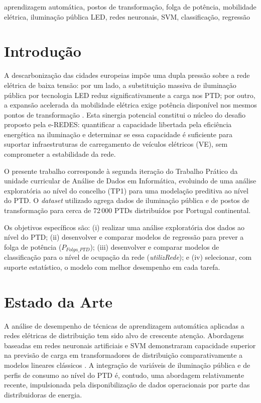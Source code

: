 \documentclass[conference]{IEEEtran}
\begin{document}
\begin{IEEEkeywords}
aprendizagem automática, postos de transformação, folga de potência, mobilidade elétrica, iluminação pública LED, redes neuronais, SVM, classificação, regressão
\end{IEEEkeywords}

\section{Introdução}

A descarbonização das cidades europeias impõe uma dupla pressão sobre a rede elétrica de baixa tensão: por um lado, a substituição massiva de iluminação pública por tecnologia LED reduz significativamente a carga nos PTD; por outro, a expansão acelerada da mobilidade elétrica exige potência disponível nos mesmos pontos de transformação \cite{eredes}. Esta sinergia potencial constitui o núcleo do desafio proposto pela e-REDES: quantificar a capacidade libertada pela eficiência energética na iluminação e determinar se essa capacidade é suficiente para suportar infraestruturas de carregamento de veículos elétricos (VE), sem comprometer a estabilidade da rede.

O presente trabalho corresponde à segunda iteração do Trabalho Prático da unidade curricular de Análise de Dados em Informática, evoluindo de uma análise exploratória ao nível do concelho (TP1) para uma modelação preditiva ao nível do PTD. O \textit{dataset} utilizado agrega dados de iluminação pública e de postos de transformação para cerca de 72\,000 PTDs distribuídos por Portugal continental.

Os objetivos específicos são: (i) realizar uma análise exploratória dos dados ao nível do PTD; (ii) desenvolver e comparar modelos de regressão para prever a folga de potência ($P_{Folga\_PTD}$); (iii) desenvolver e comparar modelos de classificação para o nível de ocupação da rede (\textit{utilizRede}); e (iv) selecionar, com suporte estatístico, o modelo com melhor desempenho em cada tarefa.

\section{Estado da Arte}

A análise de desempenho de técnicas de aprendizagem automática aplicadas a redes elétricas de distribuição tem sido alvo de crescente atenção. Abordagens baseadas em redes neuronais artificiais e SVM demonstraram capacidade superior na previsão de carga em transformadores de distribuição comparativamente a modelos lineares clássicos \cite{bishop2006,mitchell1997}. A integração de variáveis de iluminação pública e de perfis de consumo ao nível do PTD é, contudo, uma abordagem relativamente recente, impulsionada pela disponibilização de dados operacionais por parte das distribuidoras de energia.
\end{document}
